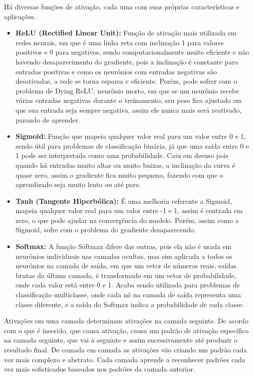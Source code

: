 Há diversas funções de ativação, cada uma com suas próprias características e aplicações.
\begin{itemize}
    \item \textbf{ReLU (Rectified Linear Unit):} Função de ativação mais utilizada em redes neurais, em que é uma linha reta com inclinação 1 para valores positivos e 0 para negativos, sendo computacionalmente muito eficiente e não havendo desaparecimento do gradiente, pois a inclinação é constante para entradas positivas e como os neurônios com entradas negativas são desativadas, a rede se torna esparsa e eficiente. Porém, pode sofrer com o problema de Dying ReLU, neurônio morto, em que se um neurônio recebe várias entradas negativas durante o treinamento, seu peso fica ajustado em que sua entrada seja sempre negativa, assim ele nunca mais será reativado, parando de aprender.
    \item \textbf{Sigmoid:} Função que mapeia qualquer valor real para um valor entre 0 e 1, sendo útil para problemas de classificação binária, já que uma saída entre 0 e 1 pode ser interpretada como uma probabilidade. Caiu em desuso pois quando há entradas muito altas ou muito baixas, a inclinação da curva é quase zero, assim o gradiente fica muito pequeno, fazendo com que o aprendizado seja muito lento ou até pare.
    \item \textbf{Tanh (Tangente Hiperbólica):} É uma melhoria referente a Sigmoid, mapeia qualquer valor real para um valor entre -1 e 1, assim é centrada em zero, o que pode ajudar na convergência do modelo. Porém, assim como a Sigmoid, sofre com o problema do gradiente desaparecendo.
    \item \textbf{Softmax:} A função Softmax difere das outras, pois ela não é usada em neurônios individuais nas camadas ocultas, mas sim aplicada a todos os neurônios na camada de saída, em que um vetor de números reais, saídas brutas da última camada, é transformado em um vetor de probabilidade, onde cada valor está entre 0 e 1. Acaba sendo utilizada para problemas de classificação multiclasse, onde cada nó na camada de saída representa uma classe diferente, e a saída do Softmax indica a probabilidade de cada classe.
\end{itemize}

Ativações em uma camada determinam ativações na camada seguinte.
De acordo com o que é inserido, que causa ativação, causa um padrão de ativação específico na camada seguinte, que vai à seguinte e assim sucessivamente até produzir o resultado final. De camada em camada as ativações vão criando um padrão cada vez mais complexo e abstrato.
Cada camada aprende a reconhecer padrões cada vez mais sofisticados baseados nos padrões da camada anterior.

